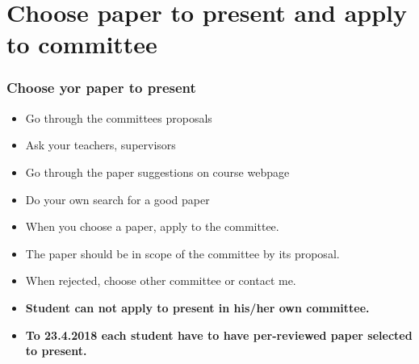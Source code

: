 \section{Choose paper to present and apply to committee}
\begin{frame}
\frametitle{Choose yor paper to present}
\begin{itemize}
\item Go through the committees proposals
\item Ask your teachers, supervisors
\item Go through the paper suggestions on course webpage
\item Do your own search for a good paper
\item When you choose a paper, apply to the committee.
\item The paper should be in scope of the committee by its proposal.
\item When rejected, choose other committee or contact me.
\item \textbf{Student can not apply to present in his/her own committee.}
\item \textbf{To 23.4.2018 each student have to have per-reviewed paper selected to present.}
\end{itemize}
\end{frame}

